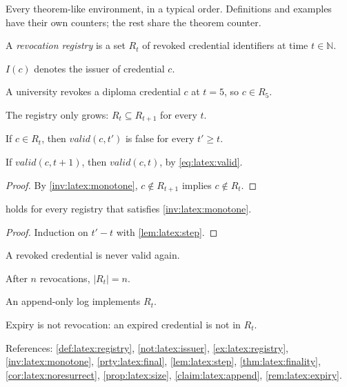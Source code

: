 Every theorem-like environment, in a typical order.
Definitions and examples have their own counters; the rest share the theorem counter.
\begin{definition}\label{def:latex:registry}
A \emph{revocation registry} is a set $R_t$ of revoked credential identifiers at time $t \in \mathbb{N}$.
\end{definition}
\begin{notation}\label{not:latex:issuer}
$I(c)$ denotes the issuer of credential $c$.
\end{notation}
\begin{example}\label{ex:latex:registry}
A university revokes a diploma credential $c$ at $t=5$, so $c \in R_5$.
\end{example}
\begin{invariant}\label{inv:latex:monotone}
The registry only grows: $R_t \subseteq R_{t+1}$ for every $t$.
\end{invariant}
\begin{property}\label{prty:latex:final}
If $c \in R_t$, then $\mathit{valid}(c, t')$ is false for every $t' \geq t$.
\end{property}
\begin{lemma}\label{lem:latex:step}
If $\mathit{valid}(c, t+1)$, then $\mathit{valid}(c, t)$, by \cref{eq:latex:valid}.
\end{lemma}
\begin{proof}
By \cref{inv:latex:monotone}, $c \notin R_{t+1}$ implies $c \notin R_t$.
\end{proof}
\begin{theorem}[Finality]\label{thm:latex:finality}
 holds for every registry that satisfies \cref{inv:latex:monotone}.
\end{theorem}
\begin{proof}
Induction on $t' - t$ with \cref{lem:latex:step}.
\end{proof}
\begin{corollary}\label{cor:latex:noresurrect}
A revoked credential is never valid again.
\end{corollary}
\begin{proposition}\label{prop:latex:size}
After $n$ revocations, $|R_t| = n$.
\end{proposition}
\begin{claim}\label{claim:latex:append}
An append-only log implements $R_t$.
\end{claim}
\begin{remark}\label{rem:latex:expiry}
Expiry is not revocation: an expired credential is not in $R_t$.
\end{remark}
References: \cref{def:latex:registry}, \cref{not:latex:issuer}, \cref{ex:latex:registry}, \cref{inv:latex:monotone}, \cref{prty:latex:final}, \cref{lem:latex:step}, \cref{thm:latex:finality}, \cref{cor:latex:noresurrect}, \cref{prop:latex:size}, \cref{claim:latex:append}, \cref{rem:latex:expiry}.

